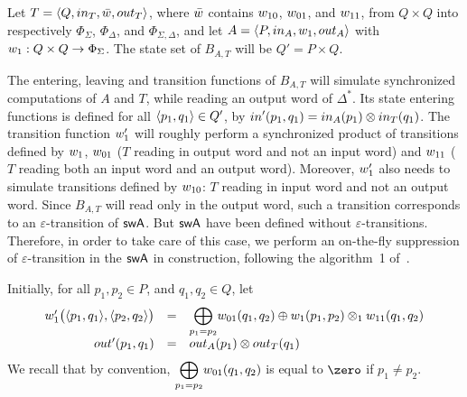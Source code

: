 %
%
Let $T = \< Q, \init_T, \bar{\wei}, \final_T >$,
where $\bar{\wei}$ contains $\wei_{10}$, $\wei_{01}$, and $\wei_{11}$,
from $Q \times Q$ into respectively
$\Phi_{\Sigma}$, $\Phi_{\Delta}$, and $\Phi_{\Sigma, \Delta}$,
and let $A = \< P, \init_A, \wei_1, \final_A >$
with $\wei_1: Q \times Q \to \Phi_{\Sigma}$.
The state set of $B_{A, T}$ will be $Q' = P \times Q$.

The entering, leaving and transition functions of $B_{A, T}$ will
simulate synchronized computations of $A$ and $T$,
while reading an output word of $\Delta^*$.
%
Its state entering functions is defined
for all $\<p_1, q_1> \in Q'$, %
by $\init'(p_1, q_1) = \init_A(p_1) \otimes \init_T(q_1)$.
%
The transition function $\wei'_1$ will roughly perform
a synchronized product of transitions defined by $\wei_1$,
$\wei_{01}$ ($T$ reading in output word and not an input word)
and $\wei_{11}$ ($T$ reading both an input word and an output word).
%
Moreover, $\wei'_1$ also needs to simulate transitions
defined by $\wei_{10}$: $T$ reading in input word and not an output word.
Since $B_{A, T}$  will read only in the output word, such a transition corresponds
to an $\varepsilon$-transition of $\textsf{swA}$.
But $\textsf{swA}$ have been defined without $\varepsilon$-transitions.
Therefore, in order to take care of this case, we perform an on-the-fly
suppression of $\varepsilon$-transition in the $\textsf{swA}$ in construction,
following the algorithm~1 of~\cite{LombardySakarovitch12ciaa}.
%


\noindent
Initially, for all $p_1, p_2 \in P$, and $q_1, q_2 \in Q$, let
\[
\begin{array}{rcl}
\wei'_1\bigl( \< p_1, q_1>, \< p_2, q_2>\bigr) & = &
{\displaystyle\bigoplus_{p_1 = p_2}} \wei_{01}(q_1, q_2)
\oplus \wei_1(p_1, p_2) \otimes_1 \wei_{11}(q_1, q_2)\\
%
\final'(p_1, q_1) & = & \final_A(p_1) \otimes \final_T(q_1)
\end{array}
\]
We recall that by convention, 
${\displaystyle\bigoplus_{p_1 = p_2}} \wei_{01}(q_1, q_2)$
is equal to $\zero$ if $p_1 \neq p_2$.


